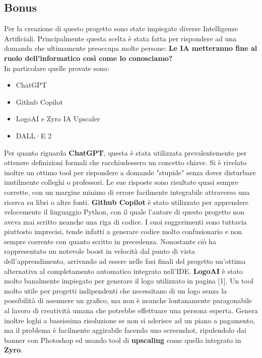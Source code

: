 \documentclass{article}
\begin{document}
        \subsection{Bonus}
        Per la creazione di questo progetto sono state impiegate diverse Intelligenze Artificiali. Principalmente questa scelta è stata fatta per rispondere ad una domanda che ultimamente preoccupa molte persone: \textbf{Le IA metteranno fine al ruolo dell'informatico così come lo conosciamo?}\newline\\
        In particolare quelle provate sono:
        \begin{itemize}
            \item ChatGPT
            \item Github Copilot
            \item LogoAI e Zyro IA Upscaler
            \item DALL·E 2
        \end{itemize}
        Per quanto riguarda \textbf{ChatGPT}, questa è stata utilizzata prevalentemente per ottenere definizioni formali che racchiudessero un concetto chiave. Si è rivelato inoltre un ottimo tool per rispondere a domande "stupide" senza dover disturbare inutilmente colleghi o professori. Le sue risposte sono risultate quasi sempre corrette, con un margine minimo di errore facilmente integrabile attraverso una ricerca su libri o altre fonti.\newline
        \textbf{Github Copilot} è stato utilizzato per apprendere velocemente il linguaggio Python, con il quale l'autore di questo progetto non aveva mai scritto neanche una riga di codice. I suoi suggerimenti sono tuttavia piuttosto imprecisi, tende infatti a generare codice molto confusionario e non sempre coerente con quanto scritto in precedenza. Nonostante ciò ha rappresentato un notevole boost in velocità dal punto di vista dell'apprendimento, arrivando ad essere nelle fasi finali del progetto un'ottima alternativa al completamento automatico integrato nell'IDE.\newline
        \textbf{LogoAI} è stato molto banalmente impiegato per generare il logo utilizzato in pagina [1]. Un tool molto utile per progetti indipendenti che necessitano di un logo senza la possibilità di assumere un grafico, ma non è neanche lontanamente paragonabile al lavoro di creatività umana che potrebbe effettuare una persona esperta. Genera inoltre loghi a bassissima risoluzione se non si aderisce ad un piano a pagamento, ma il problema è facilmente aggirabile facendo uno screenshot, ripulendolo dai banner con Photoshop ed usando tool di \textbf{upscaling} come quello integrato in \textbf{Zyro}.\newline
\end{document}
